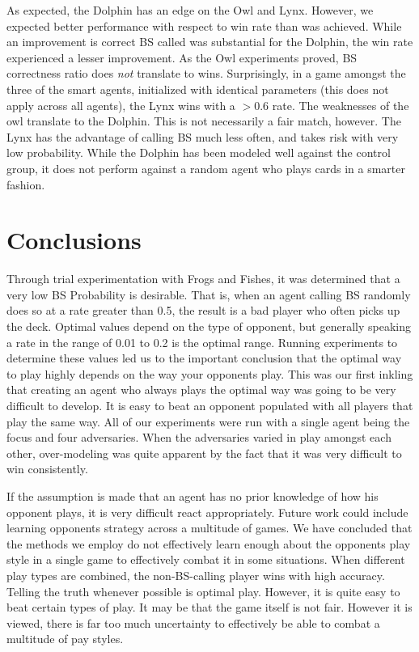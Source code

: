 \documentclass[a4paper,11pt]{article}
\begin{document}
As expected, the Dolphin has an edge on the Owl and Lynx. However, we expected better performance with respect to win rate than was achieved. While an improvement is correct BS called was substantial for the Dolphin, the win rate 
experienced a lesser improvement. As the Owl experiments proved, BS correctness ratio does \emph{not} translate to wins. Surprisingly, in a game amongst the three of the smart agents, initialized with identical parameters (this does not apply across all agents), the Lynx wins with a $> 0.6$ rate. The weaknesses of the owl translate to the Dolphin. This is not necessarily a fair match, however. The Lynx has the advantage of calling BS much less often, and takes risk with very low probability. While the Dolphin has been modeled well against the control group, it does not perform against a random agent who plays cards in a smarter fashion.







\section{Conclusions}

Through trial experimentation with Frogs and Fishes, it was determined that a very low BS Probability is desirable. That is, when an agent calling BS randomly does so at a rate greater than 0.5, the result is a bad player who often picks up the deck. Optimal values depend on the type of opponent, but generally speaking a rate in the range of 0.01 to 0.2 is the optimal range. Running experiments to determine these values led us to the important conclusion that the optimal way to play highly depends on the way your opponents play. This was our first inkling that creating an agent who always plays the optimal way was going to be very difficult to develop. It is easy to beat an opponent populated with all players that play the same way. All of our experiments were run with a single agent being the focus and four adversaries. When the adversaries varied in play amongst each other, over-modeling was quite apparent by the fact that it was very difficult to win consistently.

If the assumption is made that an agent has no prior knowledge of how his opponent plays, it is very difficult react appropriately. Future work could include learning opponents strategy across a multitude of games. We have concluded that the
methods we employ do not effectively learn enough about the opponents play style in a single game to effectively combat it in some situations. When different play types are combined, the non-BS-calling player wins with high accuracy. Telling the truth whenever possible is optimal play. However, it is quite easy to beat certain types of play. It may be that the game itself is not fair. However it is viewed, there is far too much uncertainty to effectively be able to combat a multitude of pay styles. 






\newpage






	
\end{document}
